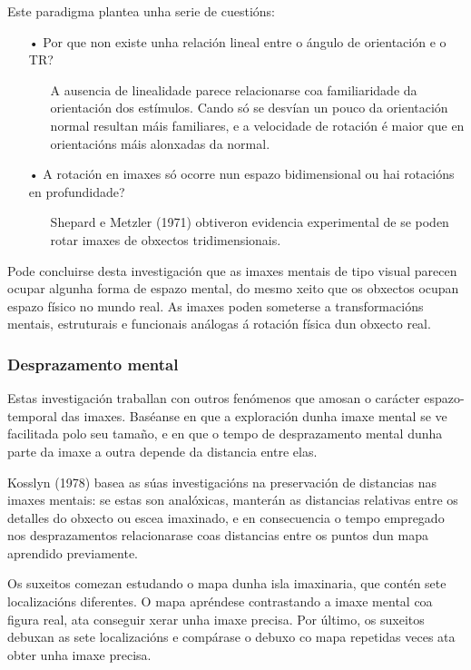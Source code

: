 \documentclass[a4paper,11pt]{article}
\begin{document}
Este paradigma plantea unha serie de cuestións: 
\begin{itemize}
	\item[•] Por que non existe unha relación lineal entre o ángulo de orientación e o TR?
	\begin{itemize}
		\item[] A ausencia de linealidade parece relacionarse coa familiaridade da orientación dos 
		estímulos. Cando só se desvían un pouco da orientación normal resultan máis familiares, e a 
		velocidade de rotación é maior que en orientacións máis alonxadas da normal.
	\end{itemize}
	\item[•] A rotación en imaxes só ocorre nun espazo bidimensional ou hai rotacións en 
	profundidade?
	\begin{itemize}
		\item[] Shepard e Metzler (1971) obtiveron evidencia experimental de se poden rotar imaxes 
		de obxectos tridimensionais.
	\end{itemize}
\end{itemize}

Pode concluirse desta investigación que as imaxes mentais de tipo visual parecen ocupar algunha forma de espazo mental, do mesmo xeito que os obxectos ocupan espazo físico no mundo real. As imaxes poden someterse a transformacións mentais, estruturais e funcionais análogas á rotación física dun obxecto real. 

\subsubsection{Desprazamento mental}
Estas investigación traballan con outros fenómenos que amosan o carácter espazo-temporal das imaxes. Baséanse en que a exploración dunha imaxe mental se ve facilitada polo seu tamaño, e en que o tempo de desprazamento mental dunha parte da imaxe a outra depende da distancia entre elas. 

Kosslyn (1978) basea as súas investigacións na preservación de distancias nas imaxes mentais: se estas son analóxicas, manterán as distancias relativas entre os detalles do obxecto ou escea imaxinado, e en consecuencia o tempo empregado nos desprazamentos relacionarase coas distancias entre os puntos dun mapa aprendido previamente. 

Os suxeitos comezan estudando o mapa dunha isla imaxinaria, que contén sete localizacións diferentes. O mapa apréndese contrastando a imaxe mental coa figura real, ata conseguir xerar unha imaxe precisa. Por último, os suxeitos debuxan as sete localizacións e compárase o debuxo co mapa repetidas veces ata obter unha imaxe precisa.
\end{document}
